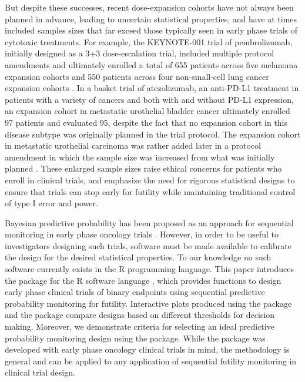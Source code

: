 But despite these successes, recent dose-expansion cohorts have not
always been planned in advance, leading to uncertain statistical
properties, and have at times included samples sizes that far exceed
those typically seen in early phase trials of cytotoxic treatments. For
example, the KEYNOTE-001 trial of pembrolizumab, initially designed as a
3+3 dose-escalation trial, included multiple protocol amendments and
ultimately enrolled a total of 655 patients across five melanoma
expansion cohorts and 550 patients across four non-small-cell lung
cancer expansion cohorts \citep{Khoja2015}. In a basket trial of
atezolizumab, an anti-PD-L1 treatment in patients with a variety of
cancers and both with and without PD-L1 expression, an expansion cohort
in metastatic urothelial bladder cancer ultimately enrolled 97 patients
and evaluated 95, despite the fact that no expansion cohort in this
disease subtype was originally planned in the trial protocol. The
expansion cohort in metastatic urothelial carcinoma was rather added
later in a protocol amendment in which the sample size was increased
from what was initially planned \citep{Petrylak2018, Powles2014}. These
enlarged sample sizes raise ethical concerns for patients who enroll in
clinical trials, and emphasize the need for rigorous statistical designs
to ensure that trials can stop early for futility while maintaining
traditional control of type I error and power.

Bayesian predictive probability has been proposed as an approach for
sequential monitoring in early phase oncology trials
\citep{Dmitrienko2006, Lee2008, Hobbs2018, Saville2014}. However, in
order to be useful to investigators designing such trials, software must
be made available to calibrate the design for the desired statistical
properties. To our knowledge no such software currently exists in the R
programming language. This paper introduces the  package
for the R software language \citep{RCT2020}, which provides functions to
design early phase clinical trials of binary endpoints using sequential
predictive probability monitoring for futility. Interactive plots
produced using the  package \citep{Wickham2016} and the
 package \citep{Sievert2020} compare designs based on
different thresholds for decision making. Moreover, we demonstrate
criteria for selecting an ideal predictive probability monitoring design
using the  package. While the  package was
developed with early phase oncology clinical trials in mind, the
methodology is general and can be applied to any application of
sequential futility monitoring in clinical trial design.

